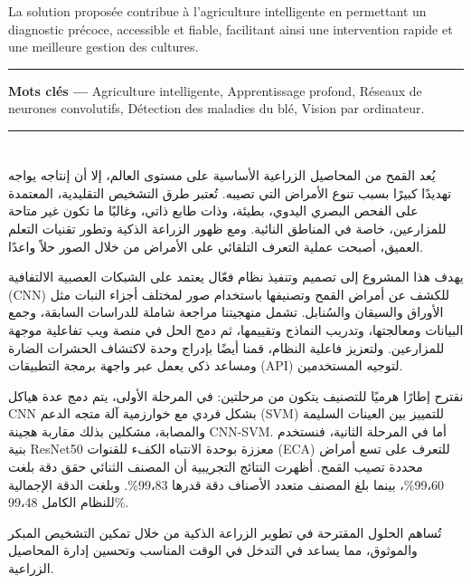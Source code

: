 La solution proposée contribue à l’agriculture intelligente en permettant un diagnostic précoce, accessible et fiable, facilitant ainsi une intervention rapide et une meilleure gestion des cultures.

\vspace{1cm}

    \noindent\rule{\linewidth}{1pt}
    \noindent
    \textbf{Mots clés —} Agriculture intelligente, Apprentissage profond, Réseaux de neurones convolutifs, Détection des maladies du blé, Vision par ordinateur.\\
    \noindent\rule{\linewidth}{1pt}







\cleardoublepage
{}
\setcounter{page}{2}
\chapter*{\Huge\bfseries\hfill{}}
\thispagestyle{noheader}


\vspace{0.1cm}

\begin{RLtext}

يُعد القمح من المحاصيل الزراعية الأساسية على مستوى العالم، إلا أن إنتاجه يواجه تهديدًا كبيرًا بسبب تنوع الأمراض التي تصيبه. تُعتبر طرق التشخيص التقليدية، المعتمدة على الفحص البصري اليدوي، بطيئة، وذات طابع ذاتي، وغالبًا ما تكون غير متاحة للمزارعين، خاصة في المناطق النائية. ومع ظهور الزراعة الذكية وتطور تقنيات التعلم العميق، أصبحت عملية التعرف التلقائي على الأمراض من خلال الصور حلاً واعدًا.

يهدف هذا المشروع إلى تصميم وتنفيذ نظام فعّال يعتمد على الشبكات العصبية الالتفافية (CNN) للكشف عن أمراض القمح وتصنيفها باستخدام صور لمختلف أجزاء النبات مثل الأوراق والسيقان والسُنابل. تشمل منهجيتنا مراجعة شاملة للدراسات السابقة، وجمع البيانات ومعالجتها، وتدريب النماذج وتقييمها، ثم دمج الحل في منصة ويب تفاعلية موجهة للمزارعين. ولتعزيز فاعلية النظام، قمنا أيضًا بإدراج وحدة لاكتشاف الحشرات الضارة ومساعد ذكي يعمل عبر واجهة برمجة التطبيقات (API) لتوجيه المستخدمين.

نقترح إطارًا هرميًا للتصنيف يتكون من مرحلتين: في المرحلة الأولى، يتم دمج عدة هياكل CNN بشكل فردي مع خوارزمية آلة متجه الدعم (SVM) للتمييز بين العينات السليمة والمصابة، مشكلين بذلك مقاربة هجينة CNN-SVM. أما في المرحلة الثانية، فنستخدم بنية ResNet50 معززة بوحدة الانتباه الكفء للقنوات (ECA) للتعرف على تسع أمراض محددة تصيب القمح. أظهرت النتائج التجريبية أن المصنف الثنائي حقق دقة بلغت 99{،}60\%، بينما بلغ المصنف متعدد الأصناف دقة قدرها 99{،}83\%. وبلغت الدقة الإجمالية للنظام الكامل 99{،}48\%.

تُساهم الحلول المقترحة في تطوير الزراعة الذكية من خلال تمكين التشخيص المبكر والموثوق، مما يساعد في التدخل في الوقت المناسب وتحسين إدارة المحاصيل الزراعية.

\end{RLtext}





